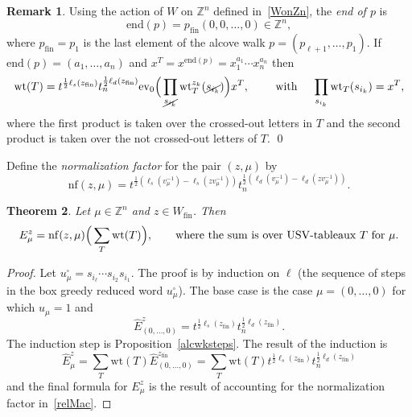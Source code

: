 \documentclass[11pt]{article}
\theoremstyle{plain}
\newtheorem{thm}{Theorem}[section]
\theoremstyle{definition}
\newtheorem{remark}[thm]{Remark}
\theoremstyle{remark}
\numberwithin{equation}{section}
\def\ZZ{\mathbb{Z}}
\def\ev{\mathrm{ev}}
\def\wt{\mathrm{wt}}
\newcounter{r}
\newcounter{s}
\begin{document}
\begin{remark}
Using the action of $W$ on $\ZZ^n$ defined in~\eqref{WonZn}, the \emph{end of $p$} is 
$$
\mathrm{end}(p)= p_{\mathrm{fin}}(0,0,\ldots, 0) \in \ZZ^{n},
$$
where $p_{\mathrm{fin}}=p_1$ is the last element of the alcove walk $p=(p_{\ell+1}, \ldots, p_1)$.
If $\mathrm{end}(p) = (a_1, \ldots, a_n)$ and 
$x^{T} = x^{\mathrm{end}(p)} = x_1^{a_1}\cdots x_n^{a_n}$ then
$$
\mathrm{wt}(T) = 
t^{\frac12\ell_s(z_{\mathrm{fin}})} t_n^{\frac12\ell_d(z_{\mathrm{fin}})} \ev_0\Big(\prod_{\cancel{s_{i_k}}} \wt^{z_k}_{T}(\cancel{s_{i_k}})\Big)x^T, \qquad \hbox{ with } \quad \prod_{s_{i_k}}\wt_T(s_{i_k} ) = x^T,
$$
where the first product is taken over the crossed-out letters in $T$ and the second product is taken over the not crossed-out letters of $T$.
\qed
\end{remark}

Define the \emph{normalization factor} for the pair $(z,\mu)$ by
\begin{equation}
\mathrm{nf}(z,\mu)
=t^{\frac12(\ell_s(v_\mu^{-1})-\ell_s(zv_\mu^{-1}))}t_n^{\frac12(\ell_d(v_\mu^{-1})-\ell_d(zv_\mu^{-1}))}.
\label{nfzmu}
\end{equation}


\begin{thm} 
\label{thm:USVformula}
Let $\mu\in \ZZ^n$ and $z\in W_{\mathrm{fin}}$. 
Then 
$$E^z_\mu = \mathrm{nf}(z,\mu)\Big(
\sum_{T} \wt(T)\Big),
\qquad
\hbox{where the sum is over USV-tableaux $T$ for $\mu$}.
$$
\end{thm}
\begin{proof}
Let $u_\mu^\square = s_{i_\ell}\cdots s_{i_2}s_{i_1}$.
The proof is by induction on $\ell$ (the sequence of steps in the box greedy reduced word $u_\mu^\square$).
The base case is the case $\mu = (0, \ldots, 0)$ for which $u_\mu = 1$ and 
$$\widehat{E}^z_{(0, \ldots, 0)}=t^{\frac12\ell_s(z_{\mathrm{fin}})}t_n^{\frac12\ell_d(z_{\mathrm{fin}})}.$$
The induction step is Proposition~\ref{alcwksteps}. 
The result of the induction is
$$\widehat{E}^z_\mu 
= \sum_T \wt(T)\widehat{E}^{z_{\mathrm{fin}}}_{(0,\ldots,0)}
= \sum_T \wt(T) t^{\frac12\ell_s(z_{\mathrm{fin}})}t_n^{\frac12\ell_d(z_{\mathrm{fin}})}
$$
and the final formula for  $E^z_\mu$ is the result of accounting for the normalization factor in~\eqref{relMac}.
\end{proof}
\end{document}
